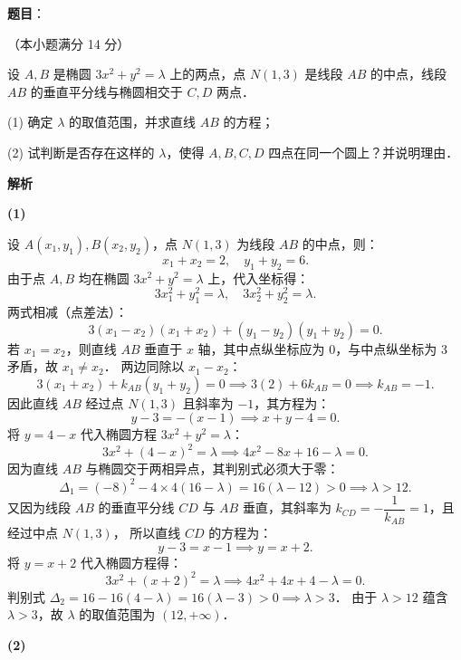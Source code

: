 \begin{answer}

\textbf{题目}：

（本小题满分 14 分）

设 $A, B$ 是椭圆 $3x^2 + y^2 = \lambda$ 上的两点，点 $N(1, 3)$ 是线段 $AB$ 的中点，线段 $AB$ 的垂直平分线与椭圆相交于 $C, D$ 两点．

(1) 确定 $\lambda$ 的取值范围，并求直线 $AB$ 的方程；

(2) 试判断是否存在这样的 $\lambda$，使得 $A, B, C, D$ 四点在同一个圆上？并说明理由．

\textbf{解析}

\textbf{(1)}

设 $A(x_1, y_1), B(x_2, y_2)$，点 $N(1, 3)$ 为线段 $AB$ 的中点，则：
\nopagebreak[4]
\[
x_1 + x_2 = 2, \quad y_1 + y_2 = 6.
\]
由于点 $A, B$ 均在椭圆 $3x^2 + y^2 = \lambda$ 上，代入坐标得：
\nopagebreak[4]
\[
3x_1^2 + y_1^2 = \lambda, \quad 3x_2^2 + y_2^2 = \lambda.
\]
两式相减（点差法）：
\nopagebreak[4]
\[
3(x_1 - x_2)(x_1 + x_2) + (y_1 - y_2)(y_1 + y_2) = 0.
\]
若 $x_1 = x_2$，则直线 $AB$ 垂直于 $x$ 轴，其中点纵坐标应为 0，与中点纵坐标为 3 矛盾，故 $x_1 \neq x_2$．
两边同除以 $x_1 - x_2$：
\nopagebreak[4]
\[
3(x_1 + x_2) + k_{AB}(y_1 + y_2) = 0 \implies 3(2) + 6 k_{AB} = 0 \implies k_{AB} = -1.
\]
因此直线 $AB$ 经过点 $N(1, 3)$ 且斜率为 $-1$，其方程为：
\nopagebreak[4]
\[
y - 3 = -(x - 1) \implies x + y - 4 = 0.
\]
将 $y = 4 - x$ 代入椭圆方程 $3x^2 + y^2 = \lambda$：
\nopagebreak[4]
\[
3x^2 + (4 - x)^2 = \lambda \implies 4x^2 - 8x + 16 - \lambda = 0.
\]
因为直线 $AB$ 与椭圆交于两相异点，其判别式必须大于零：
\nopagebreak[4]
\[
\Delta_1 = (-8)^2 - 4 \times 4(16 - \lambda) = 16(\lambda - 12) > 0 \implies \lambda > 12.
\]
又因为线段 $AB$ 的垂直平分线 $CD$ 与 $AB$ 垂直，其斜率为 $k_{CD} = -\dfrac{1}{k_{AB}} = 1$，且经过中点 $N(1, 3)$，
所以直线 $CD$ 的方程为：
\nopagebreak[4]
\[
y - 3 = x - 1 \implies y = x + 2.
\]
将 $y = x + 2$ 代入椭圆方程得：
\nopagebreak[4]
\[
3x^2 + (x + 2)^2 = \lambda \implies 4x^2 + 4x + 4 - \lambda = 0.
\]
判别式 $\Delta_2 = 16 - 16(4 - \lambda) = 16(\lambda - 3) > 0 \implies \lambda > 3$．
由于 $\lambda > 12$ 蕴含 $\lambda > 3$，故 $\lambda$ 的取值范围为 $(12, +\infty)$．

\textbf{(2)}


\end{answer}
